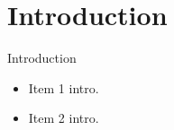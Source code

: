 \section{Introduction}



\begin{frame}{Introduction}
  \begin{itemize}
    \item Item 1 intro.
    \item Item 2 intro.
  \end{itemize}
\end{frame}

